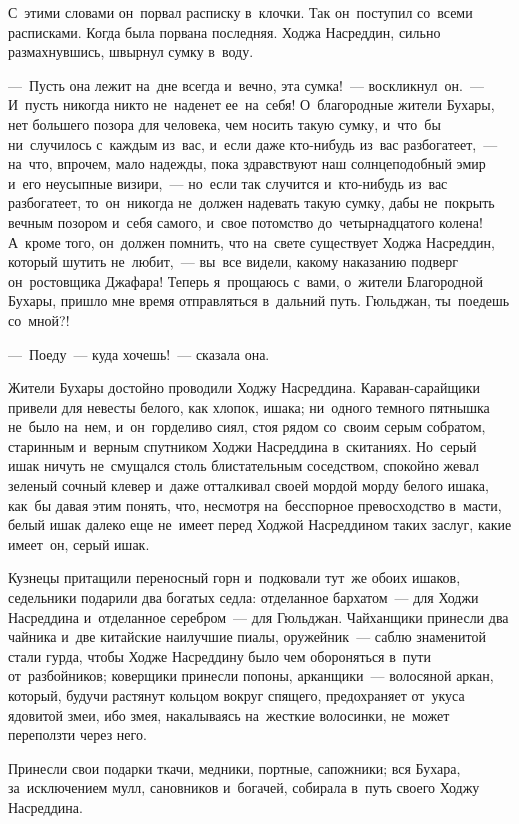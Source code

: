 \documentclass[12pt,a4paper]{book}
\begin{document}
С~этими словами он~порвал расписку в~клочки. Так он~поступил со~всеми расписками. Когда была порвана последняя. Ходжа Насреддин, сильно размахнувшись, швырнул сумку в~воду.

—~Пусть она лежит на~дне всегда и~вечно, эта сумка!~— воскликнул~он.~— И~пусть никогда никто не~наденет ее~на~себя! О~благородные жители Бухары, нет большего позора для человека, чем носить такую сумку, и~что~бы ни~случилось с~каждым из~вас, и~если даже кто-нибудь из~вас разбогатеет,~— на~что, впрочем, мало надежды, пока здравствуют наш солнцеподобный эмир и~его неусыпные визири,~— но~если так случится и~кто-нибудь из~вас разбогатеет, то~он~никогда не~должен надевать такую сумку, дабы не~покрыть вечным позором и~себя самого, и~свое потомство до~четырнадцатого колена! А~кроме того, он~должен помнить, что на~свете существует Ходжа Насреддин, который шутить не~любит,~— вы~все видели, какому наказанию подверг он~ростовщика Джафара! Теперь я~прощаюсь с~вами, о~жители Благородной Бухары, пришло мне время отправляться в~дальний путь. Гюльджан, ты~поедешь со~мной?!

—~Поеду~— куда хочешь!~— сказала она.

Жители Бухары достойно проводили Ходжу Насреддина. Караван-сарайщики привели для невесты белого, как хлопок, ишака; ни~одного темного пятнышка не~было на~нем, и~он~горделиво сиял, стоя рядом со~своим серым собратом, старинным и~верным спутником Ходжи Насреддина в~скитаниях. Но~серый ишак ничуть не~смущался столь блистательным соседством, спокойно жевал зеленый сочный клевер и~даже отталкивал своей мордой морду белого ишака, как~бы давая этим понять, что, несмотря на~бесспорное превосходство в~масти, белый ишак далеко еще не~имеет перед Ходжой Насреддином таких заслуг, какие имеет~он, серый ишак.

Кузнецы притащили переносный горн и~подковали тут~же обоих ишаков, седельники подарили два богатых седла: отделанное бархатом~— для Ходжи Насреддина и~отделанное серебром~— для Гюльджан. Чайханщики принесли два чайника и~две китайские наилучшие пиалы, оружейник~— саблю знаменитой стали гурда, чтобы Ходже Насреддину было чем обороняться в~пути от~разбойников; коверщики принесли попоны, арканщики~— волосяной аркан, который, будучи растянут кольцом вокруг спящего, предохраняет от~укуса ядовитой змеи, ибо змея, накалываясь на~жесткие волосинки, не~может переползти через него.

Принесли свои подарки ткачи, медники, портные, сапожники; вся Бухара, за~исключением мулл, сановников и~богачей, собирала в~путь своего Ходжу Насреддина.
\end{document}
